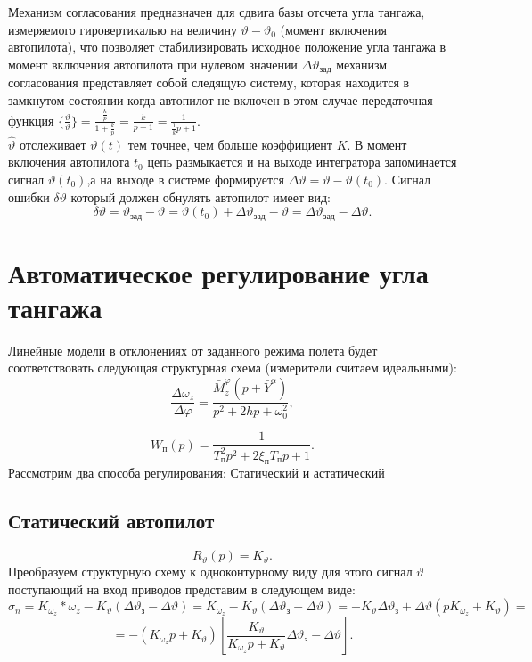 \documentclass{article}
\begin{document}
Механизм согласования предназначен для сдвига базы отсчета угла тангажа,
измеряемого гировертикалью на величину $\vartheta - \vartheta_0$ (момент
включения автопилота), что позволяет стабилизировать исходное положение угла
тангажа в момент включения автопилота при нулевом значении $\Delta
\vartheta_\text{зад}$ механизм согласования представляет собой следящую
систему, которая находится в замкнутом состоянии когда автопилот не включен в
этом случае передаточная функция $\{{\frac{\hat{\vartheta}}{\vartheta}}\}=
\frac{\frac{k}{p}}{1 + \frac{k}{p}} =\frac{k}{p+1}=\frac{1}{\frac{1}{k}p +
1}$.\\
$\hat{\vartheta}$ отслеживает $\vartheta(t)$ тем точнее, чем больше коэффициент
$K$. В момент включения автопилота $t_0$ цепь размыкается и на выходе
интегратора запоминается сигнал $\vartheta(t_0)$,а на выходе в системе
формируется $\Delta \vartheta = \vartheta - \vartheta(t_0)$. Сигнал ошибки
$\delta \vartheta $ который должен обнулять автопилот имеет вид:
\[
    \delta \vartheta = \vartheta_\text{зад} - \vartheta = \vartheta(t_0) +
    \Delta \vartheta_\text{зад} - \vartheta = \Delta \vartheta_\text{зад} -
    \Delta \vartheta.
\]
\section{Автоматическое регулирование угла тангажа}
Линейные модели в отклонениях от заданного режима полета будет соответствовать
следующая структурная схема (измерители считаем идеальными):
\[
    \frac{\Delta \omega_z}{\Delta \varphi} = \frac{\bar{M}_z^\varphi
    (p+\bar{Y}^\alpha)}{p^2 + 2hp + \omega_{0}^2},
\]

\[
    W_\text{п}(p) = \frac{1}{T_\text{п}^2 p^2 + 2 \xi_\text{п} T_\text{п} p +
    1}.
\]
Рассмотрим два способа регулирования:
Статический и астатический


\subsection{Статический автопилот}
\[
    R_{\vartheta}(p)= K_\vartheta.
\]
Преобразуем структурную схему к одноконтурному виду для этого сигнал
$\vartheta$ поступающий на вход приводов представим в следующем виде:
\[
    \sigma_n = K_{\omega_z}*\omega_z - K_\vartheta (\Delta \vartheta_\text{з} -
    \Delta \vartheta) = K_{\omega_z} - K_{\vartheta}(\Delta \vartheta_\text{з}
    - \Delta \vartheta) = -K_{\vartheta} \Delta \vartheta_\text{з} + \Delta
    \vartheta(p K_{\omega_z} + K_{\vartheta}) =
\]
\[
    = -(K_{\omega_z}p + K_\vartheta)\left[\frac{K_\vartheta}{K_{\omega_z}p +
    K_{\vartheta}}\Delta\vartheta_\text{з} - \Delta \vartheta\right].
\]
\end{document}
